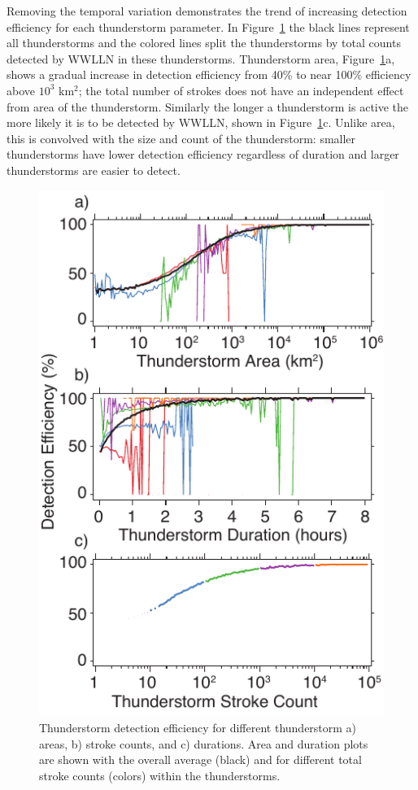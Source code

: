 Removing the temporal variation demonstrates the trend of increasing detection efficiency for each thunderstorm parameter.
In Figure~\ref{thunderstorm:fig:deParameter} the black lines represent all thunderstorms and the colored lines split the thunderstorms by total counts detected by WWLLN in these thunderstorms.
Thunderstorm area, Figure~\ref{thunderstorm:fig:deParameter}a, shows a gradual increase in detection efficiency from 40\% to near 100\% efficiency above $10^3$ km$^2$; the total number of strokes does not have an independent effect from area of the thunderstorm.
Similarly the longer a thunderstorm is active the more likely it is to be detected by WWLLN, shown in Figure~\ref{thunderstorm:fig:deParameter}c.
Unlike area, this is convolved with the size and count of the thunderstorm: smaller thunderstorms have lower detection efficiency regardless of duration and larger thunderstorms are easier to detect.

\begin{figure}[ht!]
   \centering
   \includegraphics[scale=1]{thunderstorm/Figures/deParameter.pdf}
   \caption{Thunderstorm detection efficiency for different thunderstorm a) areas, b) stroke counts, and c) durations.
           Area and duration plots are shown with the overall average (black) and for different total stroke counts (colors) within the thunderstorms.}
   \label{thunderstorm:fig:deParameter}
\end{figure}


